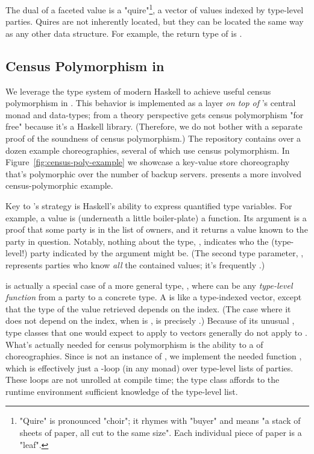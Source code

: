 The dual of a faceted value is a "quire"\footnote{
    "Quire" is pronounced "choir"; it rhymes with "buyer" and means "a stack of sheets of paper, all cut to the same size".
    Each individual piece of paper is a "leaf".
},
a vector of values indexed by type-level parties.
Quires are not inherently located, but they can be located the same way as any other data structure.
For example, the return type of  is
.

\subsection{Census Polymorphism in \MultiChor}
\label{sec:census-poly-haskell}

We leverage the type system of modern Haskell to achieve useful census polymorphism in \MultiChor.
This behavior is implemented as a layer \textit{on top of} \MultiChor's central monad and data-types;
from a theory perspective \MultiChor gets census polymorphism "for free" because it's a Haskell library.
(Therefore, we do not bother with a separate proof of the soundness of census polymorphism.)
The \MultiChor repository contains over a dozen example choreographies, several of which use census polymorphism.
In Figure~\ref{fig:census-poly-example} we showcase a key-value store choreography that's polymorphic over the number of backup servers.
 presents a more involved census-polymorphic example.

Key to \MultiChor's strategy is Haskell's ability to express quantified type variables.
For example, a  value is (underneath a little boiler-plate) a function.
Its argument is a  proof that some party is in the list of owners,
and it returns a  value known to the party in question.
Notably, nothing about the type, , indicates who the (type-level!) party indicated by the argument might be.
(The second type parameter, , represents parties who know \emph{all} the contained values;
it's frequently .)

 is actually a special case of a more general type,
, where  can be any \emph{type-level function} from a party to a concrete type.
A  is like a type-indexed vector,
except that the type of the value retrieved depends on the index.
(The case where it does not depend on the index, \ie when  is ,
is precisely .)
Because of its unusual , type classes that one would expect to apply to vectors generally do not apply to .
What's actually needed for census polymorphism is the ability to  a  of choreographies.
Since  is not an instance of ,
we implement the needed function , which is effectively just a -loop
(in any monad) over type-level lists of parties.
These loops are not unrolled at compile time;
the type class  affords to the runtime environment sufficient knowledge of the type-level list.

